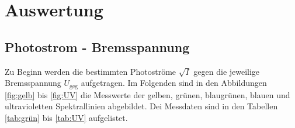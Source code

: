 \documentclass[
  bibliography=totoc,     %
  captions=tableheading,  %
  titlepage=firstiscover, %
]{scrartcl}
\begin{document}
\section{Auswertung}
\label{sec:Auswertung}
\subsection{Photostrom - Bremsspannung}
\label{subsec:a}

Zu Beginn werden die bestimmten Photoströme $\sqrt{I}$ gegen die jeweilige Bremsspannung $U_\text{geg}$ aufgetragen. Im Folgenden sind in den Abbildungen \ref{fig:gelb} bis \ref{fig:UV} die Messwerte der gelben, grünen, blaugrünen, blauen und ultravioletten Spektrallinien abgebildet. Dei Messdaten sind in den Tabellen \ref{tab:grün} bis \ref{tab:UV} aufgelistet.
\end{document}

